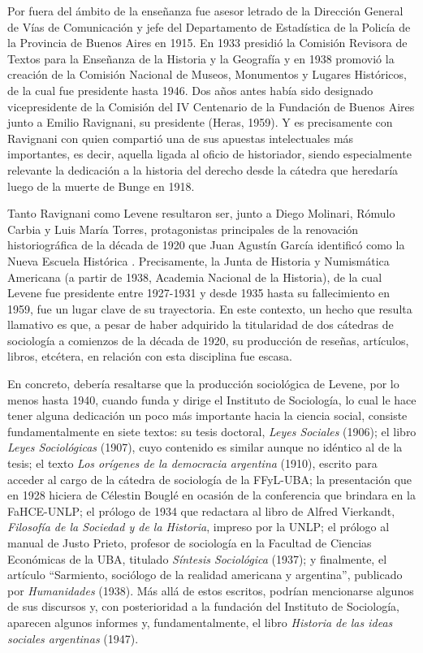Por fuera del ámbito de la enseñanza fue asesor letrado de la Dirección General de Vías de Comunicación y jefe del Departamento de Estadística de la Policía de la Provincia de Buenos Aires en 1915. En 1933 presidió la Comisión Revisora de Textos para la Enseñanza de la Historia y la Geografía y en 1938 promovió la creación de la Comisión Nacional de Museos, Monumentos y Lugares Históricos, de la cual fue presidente hasta 1946. Dos años antes había sido designado vicepresidente de la Comisión del IV Centenario de la Fundación de Buenos Aires junto a Emilio Ravignani, su presidente (Heras, 1959). Y es precisamente con Ravignani con quien compartió una de sus apuestas intelectuales más importantes, es decir, aquella ligada al oficio de historiador, siendo especialmente relevante la dedicación a la historia del derecho desde la cátedra que heredaría luego de la muerte de Bunge en 1918.

Tanto Ravignani como Levene resultaron ser, junto a Diego Molinari, Rómulo Carbia y Luis María Torres, protagonistas principales de la renovación historiográfica de la década de 1920 que Juan Agustín García identificó como la Nueva Escuela Histórica \parencite{282-ZARRILLI1998}. Precisamente, la Junta de Historia y Numismática Americana (a partir de 1938, Academia Nacional de la Historia), de la cual Levene fue presidente entre 1927-1931 y desde 1935 hasta su fallecimiento en 1959, fue un lugar clave de su trayectoria. En este contexto, un hecho que resulta llamativo es que, a pesar de haber adquirido la titularidad de dos cátedras de sociología a comienzos de la década de 1920, su producción de reseñas, artículos, libros, etcétera, en relación con esta disciplina fue escasa.

En concreto, debería resaltarse que la producción sociológica de Levene, por lo menos hasta 1940, cuando funda y dirige el Instituto de Sociología, lo cual le hace tener alguna dedicación un poco más importante hacia la ciencia social, consiste fundamentalmente en siete textos: su tesis doctoral, \emph{Leyes Sociales} (1906); el libro \emph{Leyes Sociológicas} (1907), cuyo contenido es similar aunque no idéntico al de la tesis; el texto \emph{Los orígenes de la democracia argentina} (1910), escrito para acceder al cargo de la cátedra de sociología de la FFyL-UBA; la presentación que en 1928 hiciera de Célestin Bouglé en ocasión de la conferencia que brindara en la FaHCE-UNLP; el prólogo de 1934 que redactara al libro de Alfred Vierkandt, \emph{Filosofía de la Sociedad y de la Historia}, impreso por la UNLP; el prólogo al manual de Justo Prieto, profesor de sociología en la Facultad de Ciencias Económicas de la UBA, titulado \emph{Síntesis Sociológica} (1937); y finalmente, el artículo \enquote{Sarmiento, sociólogo de la realidad americana y argentina}, publicado por \emph{Humanidades} (1938). Más allá de estos escritos, podrían mencionarse algunos de sus discursos \parencite{1621-ESCUDERO2010} y, con posterioridad a la fundación del Instituto de Sociología, aparecen algunos informes y, fundamentalmente, el libro \emph{Historia de las ideas sociales argentinas} (1947).

